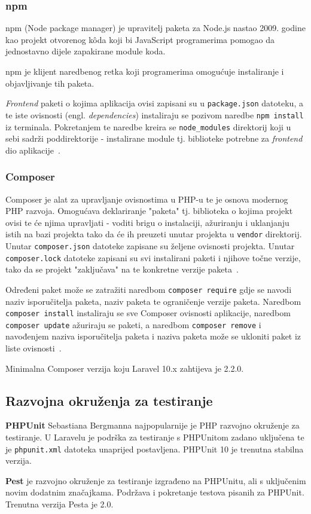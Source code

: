 \subsubsection{npm}
npm (Node package manager) je upravitelj paketa za Node.js nastao 2009. godine kao projekt otvorenog k\^oda koji bi JavaScript programerima pomogao da jednostavno dijele zapakirane module koda.

npm je klijent naredbenog retka koji programerima omogućuje instaliranje i objavljivanje tih paketa.

\textit{Frontend} paketi o kojima aplikacija ovisi zapisani su u \texttt{package.json} datoteku, a te iste ovisnosti (engl. \textit{dependencies}) instaliraju se pozivom naredbe \texttt{npm install} iz terminala. Pokretanjem te naredbe kreira se \texttt{node\_modules} direktorij koji u sebi sadrži poddirektorije - instalirane module tj. biblioteke potrebne za \textit{frontend} dio aplikacije~\cite{npm}.

\subsubsection{Composer}
Composer je alat za upravljanje ovisnostima u PHP-u te je osnova modernog PHP razvoja. Omogućava deklariranje "paketa" tj. biblioteka o kojima projekt ovisi te će njima upravljati - voditi brigu o instalaciji, ažuriranju i uklanjanju istih na bazi projekta tako da će ih preuzeti unutar projekta u \texttt{vendor} direktorij. Unutar \texttt{composer.json}
datoteke zapisane su željene ovisnosti projekta. Unutar \texttt{composer.lock} datoteke zapisani su svi instalirani paketi i njihove točne verzije, tako da se projekt "zaključava" na te konkretne verzije paketa~\cite{composerIntro}.

Određeni paket može se zatražiti naredbom \texttt{composer require} gdje se navodi naziv isporučitelja paketa, naziv paketa te ograničenje verzije paketa. Naredbom \texttt{composer install} instaliraju se sve Composer ovisnosti aplikacije, naredbom \texttt{composer update} ažuriraju se paketi, a naredbom \texttt{composer remove} i navođenjem naziva isporučitelja paketa i naziva paketa može se ukloniti paket iz liste ovisnosti~\cite{composerUsage}.

Minimalna Composer verzija koju Laravel 10.x zahtijeva je 2.2.0.

\subsection{Razvojna okruženja za testiranje}
\textbf{PHPUnit} Sebastiana Bergmanna najpopularnije je PHP razvojno okruženje za testiranje. U Laravelu je podrška za testiranje s PHPUnitom zadano uključena te je \texttt{phpunit.xml} datoteka unaprijed postavljena. PHPUnit 10 je trenutna stabilna verzija.

\textbf{Pest} je razvojno okruženje za testiranje izgrađeno na PHPUnitu, ali s uključenim novim dodatnim značajkama. Podržava i pokretanje testova pisanih za PHPUnit. Trenutna verzija Pesta je 2.0.